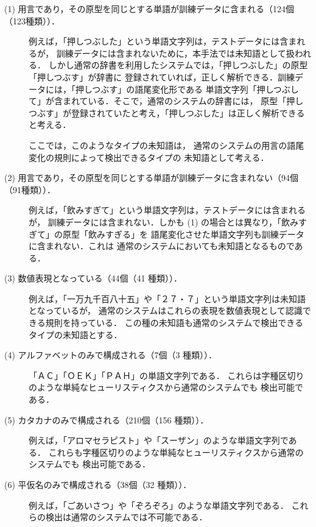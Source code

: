 \begin{description}
\item[(1) 用言であり，その原型を同じとする単語が訓練データに含まれる（124個（123種類））．]

例えば，「押しつぶした」という単語文字列は，テストデータには含まれるが，
訓練データには含まれないために，本手法では未知語として扱われる．
しかし通常の辞書を利用したシステムでは，「押しつぶした」の原型「押しつぶす」が辞書に
登録されていれば，正しく解析できる．訓練データには，「押しつぶす」の語尾変化形である
単語文字列「押しつぶして」が含まれている．そこで，通常のシステムの辞書には，
原型「押しつぶす」が登録されていたと考え，「押しつぶした」は正しく解析できると考える．

ここでは，このようなタイプの未知語は，
通常のシステムの用言の語尾変化の規則によって検出できるタイプの
未知語として考える．

\item[(2)  用言であり，その原型を同じとする単語が訓練データに含まれない（94個（91種類））．]

例えば，「飲みすぎて」という単語文字列は，テストデータには含まれるが，
訓練データには含まれない．しかも (1) の場合とは異なり，「飲みすぎて」の原型「飲みすぎる」を
語尾変化させた単語文字列も訓練データに含まれない．これは
通常のシステムにおいても未知語となるものである．

\item[(3) 数値表現となっている（44個（41 種類））．]

例えば，「一万九千百八十五」や「２７・７」という単語文字列は未知語となっているが，
通常のシステムはこれらの表現を数値表現として認識できる規則を持っている．
この種の未知語も通常のシステムで検出できるタイプの未知語とする．

\item[(4) アルファベットのみで構成される（7個（3 種類））．]

「ＡＣ」「ＯＥＫ」「ＰＡＨ」の単語文字列である．
これらは字種区切りのような単純なヒューリスティクスから通常のシステムでも
検出可能である．

\item[(5) カタカナのみで構成される（210個（156 種類））．]

例えば，「アロマセラピスト」や「スーザン」のような単語文字列である．
これらも字種区切りのような単純なヒューリスティクスから通常のシステムでも
検出可能である．

\item[(6) 平仮名のみで構成される（38個（32 種類））．]

例えば，「ごあいさつ」や「ぞろぞろ」のような単語文字列である．
これらの検出は通常のシステムでは不可能である．


\end{description}
